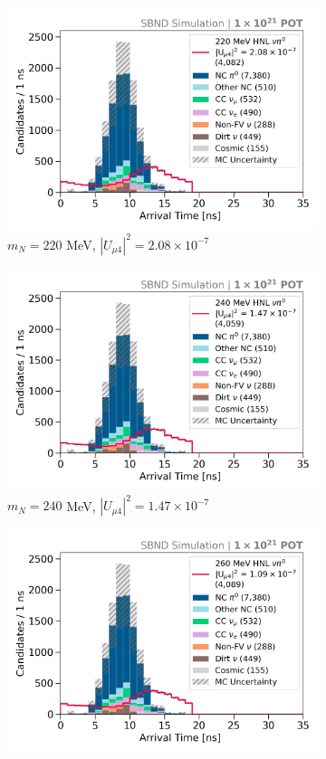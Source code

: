 \begin{figure}[hb!]
\begin{subfigure}[b]{0.495\textwidth}
            \includegraphics[width=\textwidth]{m220}
            \caption{$m_N = 220$ MeV, $|U_{\mu4}|^2 = 2.08 \times 10^{-7}$ }
        \end{subfigure}
        \begin{subfigure}[b]{0.495\textwidth}
            \includegraphics[width=\textwidth]{m240}
            \caption{$m_N = 240$ MeV, $|U_{\mu4}|^2 = 1.47 \times 10^{-7}$ }
        \end{subfigure}
	\centering
        \begin{subfigure}[b]{0.495\textwidth}
            \includegraphics[width=\textwidth]{m260}

\end{subfigure}
\end{figure}
